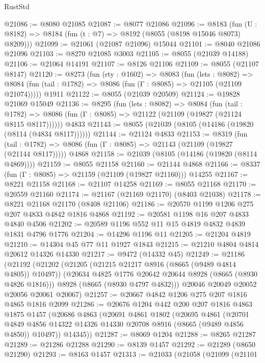 \begin{lexlean}{RustStd}
\begin{coremodule}
@21086 := @8080 @21085
@21087 := @8077 @21086
@21096 := @8183
    (fun (U : @8182) => @8184 (fun (t : @7) => @8192 (@8055 (@8198 @15046 @8073) @8209)))
@21099 := @21061 (@21087 @21096) @15044
@21101 := @8040 @21086 @21096
@21103 := @8270 @21085 @3003
@21105 := @8055 (@21039 @14188)
@21106 := @21064 @14191
@21107 := @8126 @21106
@21109 := @8055 (@21107 @8147)
@21120 := @8273
    (fun (rty : @1602) =>
    @8083
      (fun (lets : @8082) =>
      @8084 (fun (tail : @1782) => @8086 (fun (Γ : @8085) => @21105 (@21109 @21074)))))
    @1911
@21122 := @8055 (@21039 @20509)
@21124 := @19828 @21069 @15049
@21136 := @8295
    (fun (lets : @8082) =>
    @8084
      (fun (tail : @1782) =>
      @8086 (fun (Γ : @8085) => @21122 (@21109 (@19827 (@21124 @8115 @8117))))))
    @4833
@21143 := @8055 (@21039 (@8105 (@14186 (@19820 (@8114 (@4834 @8117))))))
@21144 := @21124 @4833
@21153 := @8319
    (fun (tail : @1782) => @8086 (fun (Γ : @8085) => @21143 (@21109 (@19827 (@21144 @8117)))))
    @4868
@21158 := @21039 (@8105 (@14186 (@19820 (@8114 @4869))))
@21159 := @8055 @21158
@21160 := @21144 @4868
@21166 := @8337 (fun (Γ : @8085) => @21159 (@21109 (@19827 @21160))) @14255
@21167 := @8221 @21158
@21168 := @21107 @14258
@21169 := @8055 @21168
@21170 := @20559 @21160
@21174 := @21167 (@21169 @21170) (@8403 @21038)
@21178 := @8221 @21168 @21170 (@8408 @21106)
@21186 := @20570 @1199 @1206 @275 @207 @4833 @4842 @1816 @4868
@21192 := @20581 @1198 @16 @207 @4833 @4840 @4506
@21202 := @20589 @1196 @552 @11 @15 @4819 @4832 @4839 @1831 @4796 @1776
@21204 := @14296 @1196 @11
@21205 := @21204 @4819
@21210 := @14304 @45 @77 @11 @1927 @1843
@21215 := @21210 @4804 @4814 @20612 @14326 @14330
@21217 := @9472 (@14332 @45)
@21249 := @21186
    (@21192
      (@21202
        (@21205 (@21215 @21217 @8916 (@8665 (@9489 @4814 @4805)) @10497))
        (@20634 @4825 @1776 @20642 @20644 @8928 (@8665 (@8930 @4826 @1816)))
        @8928
        (@8665 (@8930 @4797 @4832)))
      @20046
      @20049
      @20052
      @20056
      @20061
      @20067)
@21257 := @20667 @4842 @1206 @275 @207 @1816 @4865 @1816 @2099
@21286 := @20676
    @1204
    @442
    @200
    @207
    @1816
    @4863
    @1875
    @1457
    (@20686
      @4863
      (@20691
        @4861
        @1802
        (@20695
          @4861
          (@20701 @4849 @4856 @14322 @14326 @14330 @20708 @8916 (@8665 (@9489 @4856 @4850)) @10497))
        @14345))
@21287 := @8069 @1204
@21288 := @8265 @21287
@21289 := @21286 @21288
@21290 := @8139 @1457
@21292 := @21289 (@8650 @21290)
@21293 := @8163 @1457
@21313 := @21033
    (@21058
      (@21099
        (@21101

\end{coremodule}
\end{lexlean}
